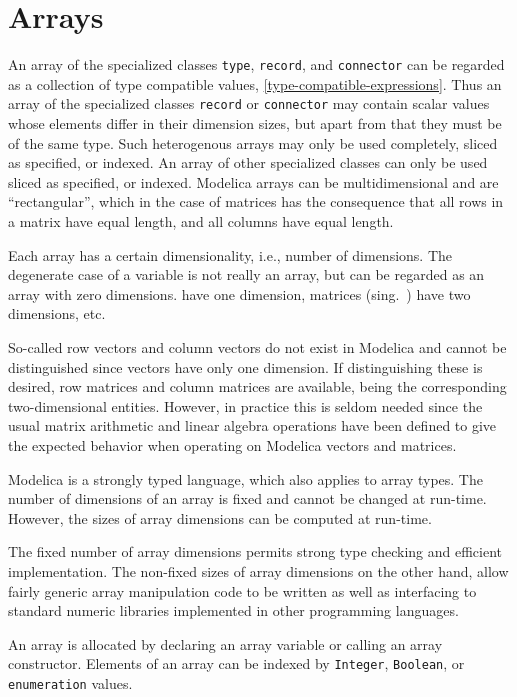 \chapter{Arrays}\label{arrays}

An array of the specialized classes \lstinline!type!, \lstinline!record!, and \lstinline!connector! can be regarded as a collection of type compatible values, \cref{type-compatible-expressions}.
Thus an array of the specialized classes \lstinline!record! or \lstinline!connector! may contain scalar values whose elements differ in their dimension sizes, but apart from that they must be of the same type.
Such heterogenous arrays may only be used completely, sliced as specified, or indexed.
An array of other specialized classes can only be used sliced as specified, or indexed.
Modelica arrays can be multidimensional and are ``rectangular'', which in the case of matrices has the consequence that all rows in a matrix have equal length, and all columns have equal length.

Each array has a certain dimensionality, i.e., number of dimensions.
The degenerate case of a  variable is not really an array, but can be regarded as an array with zero dimensions.
 have one dimension, matrices (sing.\ ) have two dimensions, etc.

So-called row vectors and column vectors do not exist in Modelica and cannot be distinguished since vectors have only one dimension.
If distinguishing these is desired, row matrices and column matrices are available, being the corresponding two-dimensional entities.
However, in practice this is seldom needed since the usual matrix arithmetic and linear algebra operations have been defined to give the expected behavior when operating on Modelica vectors and matrices.

Modelica is a strongly typed language, which also applies to array
types. The number of dimensions of an array is fixed and cannot be
changed at run-time. However, the sizes of array dimensions can
be computed at run-time.

The fixed number of array dimensions permits strong type checking and efficient implementation.  The non-fixed sizes of array
dimensions on the other hand, allow fairly generic array manipulation code to be written as well as interfacing to standard
numeric libraries implemented in other programming languages.

An array is allocated by declaring an array variable or calling an array
constructor. Elements of an array can be indexed by \lstinline!Integer!, \lstinline!Boolean!, or
\lstinline!enumeration! values.

